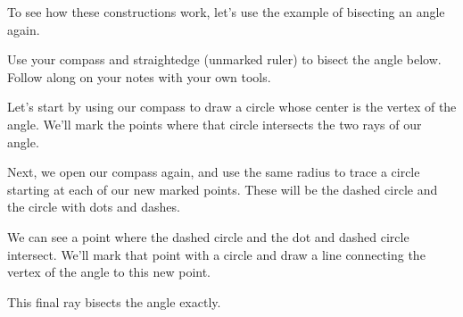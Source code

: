 \documentclass{ximera}
\begin{document}
To see how these constructions work, let's use the example of bisecting an angle again.
\begin{example}
Use your compass and straightedge (unmarked ruler) to bisect the angle below. Follow along on your notes with your own tools.
\begin{center}
\end{center}
Let's start by using our compass to draw a circle whose center is the vertex of the angle. We'll mark the points where that circle intersects the two rays of our angle.
\begin{center}
\end{center}
Next, we open our compass again, and use the same radius to trace a circle starting at each of our new marked points. These will be the dashed circle and the circle with dots and dashes.
\begin{center}
\end{center}
We can see a point where the dashed circle and the dot and dashed circle intersect. We'll mark that point with a circle and draw a line connecting the vertex of the angle to this new point.
\begin{center}
\end{center}
This final ray bisects the angle exactly.
\end{example}
\end{document}
